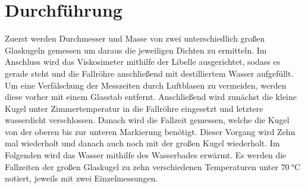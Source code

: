 
\section{Durchführung}
\label{sec:Durchführung}
Zuerst werden Durchmesser und Masse von zwei unterschiedlich großen Glaskugeln
gemessen um daraus die jeweiligen Dichten zu ermitteln. Im Anschluss wird das
Viskosimeter mithilfe der Libelle ausgerichtet, sodass es gerade steht und die Fallröhre anschließend
mit destilliertem Wasser aufgefüllt. Um eine Verfälschung der Messzeiten durch
Luftblasen zu vermeiden, werden diese vorher mit einem Glasstab entfernt.
Anschließend wird zunächst die kleine Kugel unter Zimmertemperatur in die
Fallröhre eingesetzt und letztere wasserdicht verschlossen. Danach wird die Fallzeit
gemessen, welche die Kugel von der oberen bis zur unteren Markierung benötigt.
Dieser Vorgang wird Zehn mal wiederholt und danach auch noch mit der großen Kugel
wiederholt. Im Folgenden wird das Wasser mithilfe des Wasserbades erwärmt. Es
werden die Fallzeiten der großen Glaskugel zu zehn verschiedenen Temperaturen unter $\SI{70}{\degreeCelsius}$ notiert, jeweils mit
zwei Einzelmessungen.
